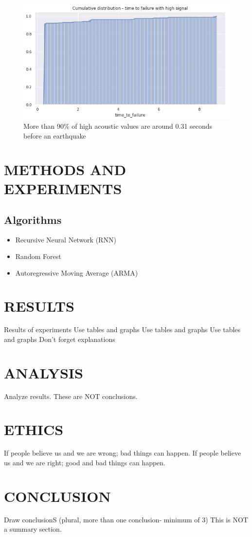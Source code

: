 \documentclass[]{llncs}
\begin{document}
\begin{figure}
	\centering
	\includegraphics[width=0.7\linewidth]{../GPUProject/moreThan90percent}
	\caption{More than 90\% of high acoustic values are around 0.31 seconds before an earthquake}
		\label{fig:morethan90percent}
	\end{figure}






\section{METHODS AND EXPERIMENTS}

\subsection{Algorithms}

\begin{itemize}
	\item Recursive Neural Network (RNN)
	\item Random Forest
	\item Autoregressive Moving Average (ARMA)
\end{itemize}


\section{RESULTS}
Results of experiments
Use tables and graphs
Use tables and graphs
Use tables and graphs
Don't forget explanations
\section{ANALYSIS}
Analyze results.
These are NOT conclusions.
\section{ETHICS}
If people believe us and we are wrong; bad things can happen. If people believe us and we are right; good and bad things can happen.
\section{CONCLUSION}
Draw conclusionS (plural, more than one conclusion- minimum of 3)
This is NOT a summary section.


\end{document}
